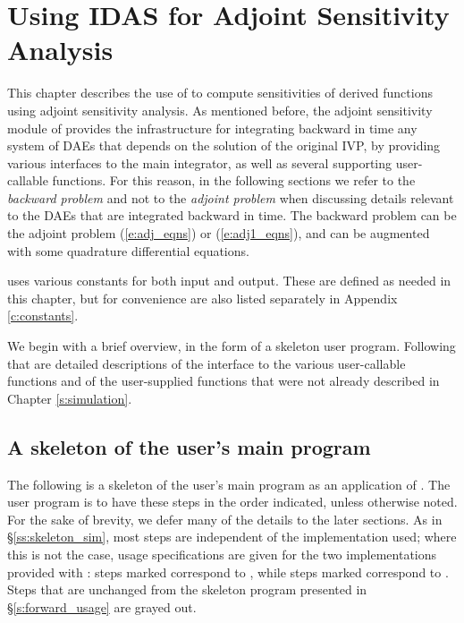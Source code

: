 \chapter{Using IDAS for Adjoint Sensitivity Analysis}\label{s:adjoint}

This chapter describes the use of {\idas} to compute sensitivities of derived 
functions using adjoint sensitivity analysis. As mentioned before, the adjoint
sensitivity module of {\idas} provides the infrastructure for integrating
backward in time any system of DAEs that depends on the solution of the original
IVP, by providing various interfaces to the main {\idas} integrator, as well 
as several supporting user-callable functions. For this reason, in the following
sections we refer to the {\em backward problem} and not to the 
{\em adjoint problem} when discussing details relevant to the DAEs that
are integrated backward in  time. The backward problem can be the adjoint problem
(\ref{e:adj_eqns}) or (\ref{e:adj1_eqns}), and
can be augmented with some quadrature differential equations.

{\idas} uses various constants for both input and output.  These are
defined as needed in this chapter, but for convenience are also listed
separately in Appendix \ref{c:constants}.

We begin with a brief overview, in the form of a skeleton user program.
Following that are detailed descriptions of the interface to the
various user-callable functions and of the user-supplied functions that were
not already described in Chapter \ref{s:simulation}.

\section{A skeleton of the user's main program}
\label{ss:skeleton_adj}

The following is a skeleton of the user's main program as an application of
{\idas}. The user program is to have these steps in the order indicated, 
unless otherwise noted. For the sake of brevity, we defer many of the details to 
the later sections.
As in \S\ref{ss:skeleton_sim}, most steps are independent of the {\nvector}
implementation used; where this is not the case, usage specifications are given for
the two implementations provided with {\idas}: steps marked {\p} correspond to 
{\nvecp}, while steps marked {\s} correspond to {\nvecs}.
Steps that are unchanged from the skeleton program presented in
\S\ref{s:forward_usage} are grayed out.


